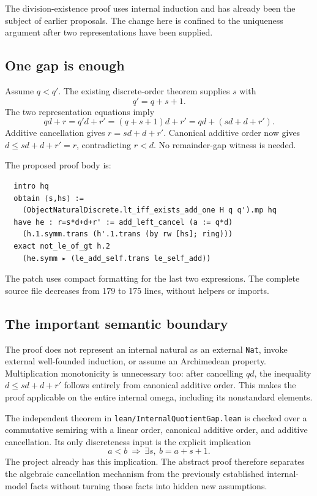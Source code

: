 \documentclass[11pt,letterpaper]{article}
\newcommand{\code}[1]{\nolinkurl{#1}}
\begin{document}
The division-existence proof uses internal induction and has already been the subject of earlier proposals. The change here is confined to the uniqueness argument after two representations have been supplied.

\subsection{One gap is enough}

Assume $q<q'$. The existing discrete-order theorem supplies $s$ with
\[
 q'=q+s+1.
\]
The two representation equations imply
\[
 qd+r=q'd+r'=(q+s+1)d+r'=qd+(sd+d+r').
\]
Additive cancellation gives $r=sd+d+r'$. Canonical additive order now gives $d\le sd+d+r'=r$, contradicting $r<d$. No remainder-gap witness is needed.

The proposed proof body is:
\begin{lstlisting}
  intro hq
  obtain ⟨s,hs⟩ :=
    (ObjectNaturalDiscrete.lt_iff_exists_add_one H q q').mp hq
  have he : r=s*d+d+r' := add_left_cancel (a := q*d)
    (h.1.symm.trans (h'.1.trans (by rw [hs]; ring)))
  exact not_le_of_gt h.2
    (he.symm ▸ (le_add_self.trans le_self_add))
\end{lstlisting}
The patch uses compact formatting for the last two expressions. The complete source file decreases from 179 to 175 lines, without helpers or imports.

\subsection{The important semantic boundary}

The proof does not represent an internal natural as an external \code{Nat}, invoke external well-founded induction, or assume an Archimedean property. Multiplication monotonicity is unnecessary too: after cancelling $qd$, the inequality $d\le sd+d+r'$ follows entirely from canonical additive order. This makes the proof applicable on the entire internal omega, including its nonstandard elements.

The independent theorem in \code{lean/InternalQuotientGap.lean} is checked over a commutative semiring with a linear order, canonical additive order, and additive cancellation. Its only discreteness input is the explicit implication
\[
 a<b\ \Longrightarrow\ \exists s,\ b=a+s+1.
\]
The project already has this implication. The abstract proof therefore separates the algebraic cancellation mechanism from the previously established internal-model facts without turning those facts into hidden new assumptions.
\end{document}
